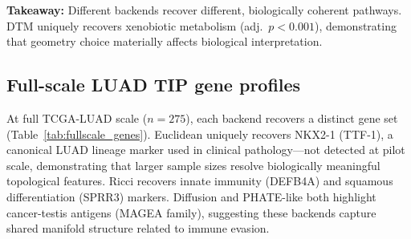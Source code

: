 \documentclass[12pt]{article}
\begin{document}
\textbf{Takeaway:} Different backends recover different, biologically coherent pathways. DTM uniquely recovers xenobiotic metabolism (adj.\ $p < 0.001$), demonstrating that geometry choice materially affects biological interpretation.

\subsection{Full-scale LUAD TIP gene profiles}
\label{sec:fullscale_genes}

At full TCGA-LUAD scale ($n = 275$), each backend recovers a distinct gene set (Table~\ref{tab:fullscale_genes}).
Euclidean uniquely recovers NKX2-1 (TTF-1), a canonical LUAD lineage marker used in clinical pathology---not detected at pilot scale, demonstrating that larger sample sizes resolve biologically meaningful topological features.
Ricci recovers innate immunity (DEFB4A) and squamous differentiation (SPRR3) markers.
Diffusion and PHATE-like both highlight cancer-testis antigens (MAGEA family), suggesting these backends capture shared manifold structure related to immune evasion.
\end{document}
